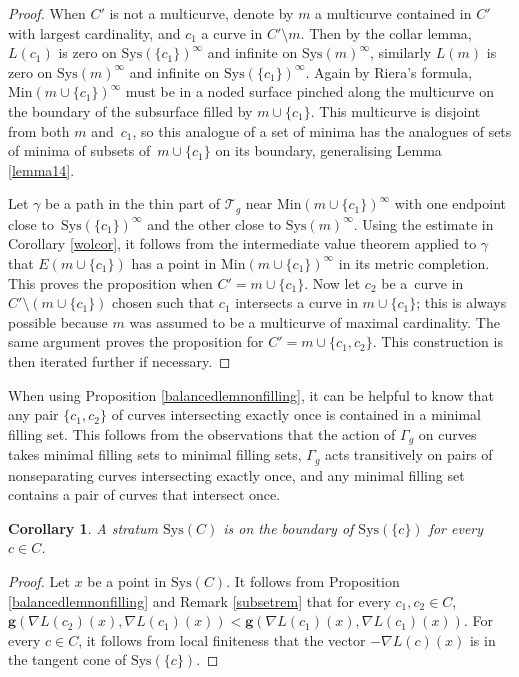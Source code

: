 \documentclass[11pt]{article}
\numberwithin{equation}{section}
\numberwithin{equation}{section}
\newtheorem{Corollary}[Theorem]{Corollary}
\begin{document}
\begin{proof}
When $C'$ is not a multicurve, denote by $m$ a multicurve contained in $C'$ with largest cardinality, and $c_{1}$ a curve in $C'\setminus m$. Then by the collar lemma, $L(c_{1})$ is zero on $\mathrm{Sys}(\{c_{1}\})^{\infty}$ and infinite on $\mathrm{Sys}(m)^{\infty}$, similarly $L(m)$ is zero on $\mathrm{Sys}(m)^{\infty}$ and infinite on $\mathrm{Sys}(\{c_{1}\})^{\infty}$. Again by Riera's formula, $\mathrm{Min}(m\cup\{c_{1}\})^{\infty}$ must be in a noded surface pinched along the multicurve on the boundary of the subsurface filled by $m\cup\{c_{1}\}$. This multicurve is disjoint from both $m$ and~$c_{1}$, so this analogue of a set of minima has the analogues of sets of minima of subsets of~${m\cup\{c_{1}\}}$ on its boundary, generalising Lemma \ref{lemma14}.

Let $\gamma$ be a path in the thin part of $\mathcal{T}_{g}$ near $\mathrm{Min}(m\cup\{c_{1}\})^{\infty}$ with one endpoint close to~$\mathrm{Sys}(\{c_{1}\})^{\infty}$ and the other close to $\mathrm{Sys}(m)^{\infty}$. Using the estimate in Corollary \ref{wolcor}, it follows from the intermediate value theorem applied to $\gamma$ that $E(m\cup\{c_{1}\})$ has a point in $\mathrm{Min}(m\cup\{c_{1}\})^{\infty}$ in its metric completion. This proves the proposition when $C'=m\cup \{c_{1}\}$. Now let $c_{2}$ be a~curve in $C'\setminus (m\cup \{c_{1}\})$ chosen such that $c_{1}$ intersects a curve in $m\cup \{c_{1}\}$; this is always possible because $m$ was assumed to be a multicurve of maximal cardinality. The same argument proves the proposition for $C'=m\cup \{c_{1},c_{2}\}$. This construction is then iterated further if necessary.
\end{proof}

\begin{Remark}
\label{subsetrem}
When using Proposition \ref{balancedlemnonfilling}, it can be helpful to know that any pair $\{c_{1}, c_{2}\}$ of curves intersecting exactly once is contained in a minimal filling set. This follows from the observations that the action of $\Gamma_{g}$ on curves takes minimal filling sets to minimal filling sets, $\Gamma_{g}$ acts transitively on pairs of nonseparating curves intersecting exactly once, and any minimal filling set contains a pair of curves that intersect once.
\end{Remark}

\begin{Corollary}
\label{polytopecor}
A stratum $\mathrm{Sys}(C)$ is on the boundary of $\mathrm{Sys}(\{c\})$ for every $c\in C$.
\end{Corollary}
\begin{proof}
Let $x$ be a point in $\mathrm{Sys}(C)$. It follows from Proposition \ref{balancedlemnonfilling} and Remark \ref{subsetrem} that for every $c_{1}, c_{2}\in C$, $\mathbf{g}(\nabla L(c_{2})(x),\nabla L(c_{1})(x))<\mathbf{g}(\nabla L(c_{1})(x), \nabla L(c_{1})(x))$. For every $c\in C$, it follows from local finiteness that the vector $-\nabla L(c)(x)$ is in the tangent cone of $\mathrm{Sys}(\{c\})$.
\end{proof}
\end{document}
